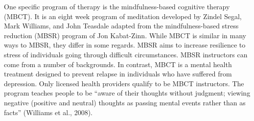 One specific program of therapy is the mindfulness-based cognitive therapy (MBCT). It is an eight week program of meditation developed by Zindel Segal, Mark Williams, and John Teasdale adapted from the mindfulness-based stress reduction (MBSR) program of Jon Kabat-Zinn. While MBCT is similar in many ways to MBSR, they differ in some regards. MBSR aims to increase resilience to stress of individuals going through difficult circumstances. MBSR instructors can come from a number of backgrounds. In contrast, MBCT is a mental health treatment designed to prevent relapse in individuals who have suffered from depression. Only licensed health providers qualify to be MBCT instructors. The program teaches people to be “aware of their thoughts without judgment; viewing negative (positive and neutral) thoughts as passing mental events rather than as facts” (Williams et al., 2008).